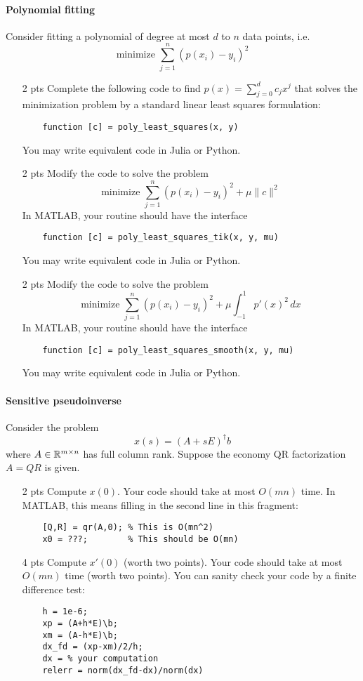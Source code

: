 \documentclass[12pt, leqno]{article} %
\begin{document}
\paragraph*{Polynomial fitting}
Consider fitting a polynomial of degree at most $d$
to $n$ data points, i.e.
\[
  \mbox{minimize } \sum_{j=1}^n (p(x_i)-y_i)^2
\]
\begin{itemize}
\item[2 pts]
  Complete the following code to find $p(x) = \sum_{j=0}^d c_j x^j$
  that solves the minimization problem by a standard
  linear least squares formulation:
  \begin{lstlisting}
    function [c] = poly_least_squares(x, y)
  \end{lstlisting}
  You may write equivalent code in Julia or Python.
\item[2 pts]
  Modify the code to solve the problem
  \[
    \mbox{minimize } \sum_{j=1}^n (p(x_i)-y_i)^2 +
    \mu \|c\|^2
  \]
  In MATLAB, your routine should have the interface
  \begin{lstlisting}
    function [c] = poly_least_squares_tik(x, y, mu)
  \end{lstlisting}
  You may write equivalent code in Julia or Python.
\item[2 pts]
  Modify the code to solve the problem
  \[
    \mbox{minimize } \sum_{j=1}^n (p(x_i)-y_i)^2 +
    \mu \int_{-1}^1 p'(x)^2 \, dx
    \]
  In MATLAB, your routine should have the interface
  \begin{lstlisting}
    function [c] = poly_least_squares_smooth(x, y, mu)
  \end{lstlisting}
  You may write equivalent code in Julia or Python.
\end{itemize}


\paragraph*{Sensitive pseudoinverse}
Consider the problem
\[
  x(s) = (A+sE)^\dagger b
\]
where $A \in \mathbb{R}^{m \times n}$ has full column rank.  Suppose
the economy QR factorization $A = QR$ is given.
\begin{itemize}
\item[2 pts]
  Compute $x(0)$.  Your code should take at most $O(mn)$ time.  In MATLAB,
  this means filling in the second line in this fragment:
  \begin{lstlisting}
    [Q,R] = qr(A,0); % This is O(mn^2)
    x0 = ???;        % This should be O(mn)
  \end{lstlisting}
\item[4 pts]
  Compute $x'(0)$ (worth two points).
  Your code should take at most $O(mn)$ time (worth two points).
  You can sanity check your code by a finite difference test:
  \begin{lstlisting}
    h = 1e-6;
    xp = (A+h*E)\b;
    xm = (A-h*E)\b;
    dx_fd = (xp-xm)/2/h;
    dx = % your computation
    relerr = norm(dx_fd-dx)/norm(dx)
  \end{lstlisting}
\end{itemize}
\end{document}
